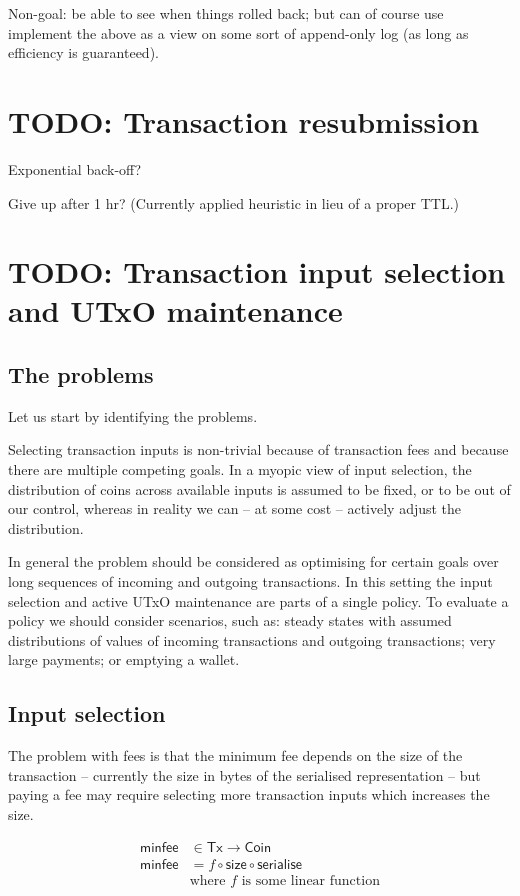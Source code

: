 \documentclass{article}
\begin{document}
Non-goal: be able to see when things rolled back; but can of course use
implement the above as a view on some sort of append-only log
(as long as efficiency is guaranteed).

\section{TODO: Transaction resubmission}

Exponential back-off?

Give up after 1 hr? (Currently applied heuristic in lieu of a proper TTL.)

\section{TODO: Transaction input selection and UTxO maintenance}

\subsection{The problems}

Let us start by identifying the problems.

Selecting transaction inputs is non-trivial because of transaction fees and
because there are multiple competing goals. In a myopic view of input
selection, the distribution of coins across available inputs is assumed to be
fixed, or to be out of our control, whereas in reality we can -- at some cost
-- actively adjust the distribution.

In general the problem should be considered as optimising for certain goals
over long sequences of incoming and outgoing transactions. In this setting
the input selection and active UTxO maintenance are parts of a single policy.
To evaluate a policy we should consider scenarios, such as: steady states with
assumed distributions of values of incoming transactions and outgoing
transactions; very large payments; or emptying a wallet.

\subsection{Input selection}

The problem with fees is that the minimum fee depends on the size of the transaction
-- currently the size in bytes of the serialised representation -- but paying a
fee may require selecting more transaction inputs which increases the size.

\begin{equation}
\begin{split}
\mathsf{minfee} & \in \mathsf{Tx} \to \mathsf{Coin} \\
\mathsf{minfee} & = f \circ \mathsf{size} \circ \mathsf{serialise} \\
             & \text{where } f \text{ is some linear function}
\end{split}
\end{equation}
\end{document}
